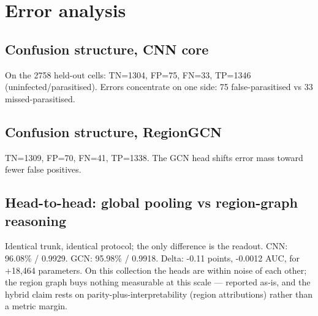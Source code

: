 
\section{Error analysis}
\subsection{Confusion structure, CNN core}
On the 2758 held-out cells:
TN=1304, FP=75, FN=33, TP=1346 (uninfected/parasitised).
Errors concentrate on one side:
75 false-parasitised vs 33 missed-parasitised.
\subsection{Confusion structure, RegionGCN}
TN=1309, FP=70, FN=41, TP=1338.
The GCN head shifts error mass toward fewer false positives.
\subsection{Head-to-head: global pooling vs region-graph reasoning}
Identical trunk, identical protocol; the only difference is the readout.
CNN: 96.08\% / 0.9929.
GCN: 95.98\% / 0.9918.
Delta: -0.11 points,
-0.0012 AUC, for
+18{,}464 parameters. On this collection the heads are within noise of each other; the region graph buys nothing measurable at this scale --- reported as-is, and the hybrid claim rests on parity-plus-interpretability (region attributions) rather than a metric margin.
